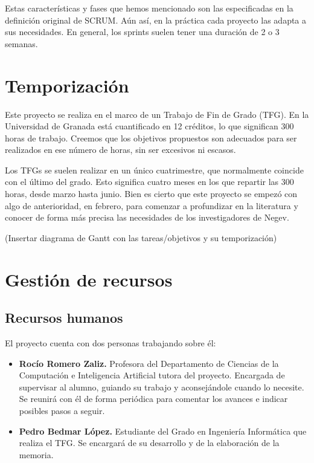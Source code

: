 Estas características y fases que hemos mencionado son las especificadas en la definición original de SCRUM. Aún así, en la práctica cada proyecto las adapta a sus necesidades. En general, los sprints suelen tener una duración de 2 o 3 semanas. 

\section*{Temporización}

Este proyecto se realiza en el marco de un Trabajo de Fin de Grado (TFG). En la Universidad de Granada está cuantificado en 12 créditos, lo que significan 300 horas de trabajo. Creemos que los objetivos propuestos son adecuados para ser realizados en ese número de horas, sin ser excesivos ni escasos.

Los TFGs se suelen realizar en un único cuatrimestre, que normalmente coincide con el último del grado. Esto significa cuatro meses en los que repartir las 300 horas, desde marzo hasta junio. Bien es cierto que este proyecto se empezó con algo de anterioridad, en febrero, para comenzar a profundizar en la literatura y conocer de forma más precisa las necesidades de los investigadores de Negev.

(Insertar diagrama de Gantt con las tareas/objetivos y su temporización)

\section*{Gestión de recursos}

\subsection*{Recursos humanos}
\noindent El proyecto cuenta con dos personas trabajando sobre él:
\begin{itemize}
    \item \textbf{Rocío Romero Zaliz.} Profesora del Departamento de Ciencias de la Computación e Inteligencia Artificial tutora del proyecto. Encargada de supervisar al alumno, guiando su trabajo y aconsejándole cuando lo necesite. Se reunirá con él de forma periódica para comentar los avances e indicar posibles pasos a seguir.
    \item \textbf{Pedro Bedmar López.} Estudiante del Grado en Ingeniería Informática que realiza el TFG. Se encargará de su desarrollo y de la elaboración de la memoria.
\end{itemize}

